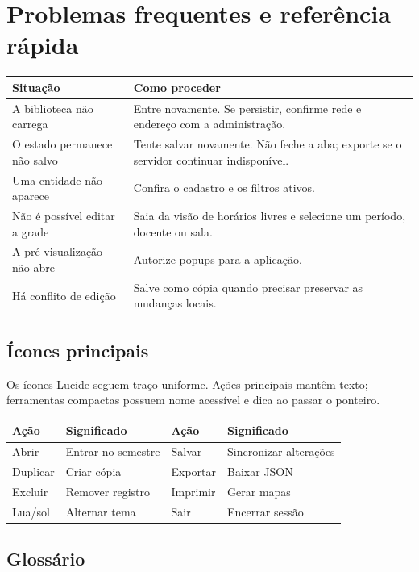 \chapter{Problemas frequentes e referência rápida}

\begin{longtable}{@{}p{}p{}@{}}
\toprule
\textbf{Situação} & \textbf{Como proceder} \\
\midrule
\endhead
A biblioteca não carrega & Entre novamente. Se persistir, confirme rede e endereço com a administração. \\
O estado permanece não salvo & Tente salvar novamente. Não feche a aba; exporte se o servidor continuar indisponível. \\
Uma entidade não aparece & Confira o cadastro e os filtros ativos. \\
Não é possível editar a grade & Saia da visão de horários livres e selecione um período, docente ou sala. \\
A pré-visualização não abre & Autorize popups para a aplicação. \\
Há conflito de edição & Salve como cópia quando precisar preservar as mudanças locais. \\
\bottomrule
\end{longtable}

\section{Ícones principais}

Os ícones Lucide seguem traço uniforme. Ações principais mantêm texto; ferramentas compactas possuem nome acessível e dica ao passar o ponteiro.

\begin{tabularx}{\textwidth}{@{}lXlX@{}}
\toprule
\textbf{Ação} & \textbf{Significado} & \textbf{Ação} & \textbf{Significado} \\
\midrule
Abrir & Entrar no semestre & Salvar & Sincronizar alterações \\
Duplicar & Criar cópia & Exportar & Baixar JSON \\
Excluir & Remover registro & Imprimir & Gerar mapas \\
Lua/sol & Alternar tema & Sair & Encerrar sessão \\
\bottomrule
\end{tabularx}

\section{Glossário}

